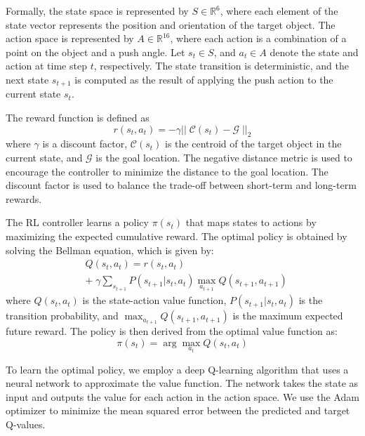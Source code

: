 Formally, the state space is represented by $S \in \mathbb{R}^{6}$, where each element of the state vector represents the position and orientation of the target object. The action space is represented by $A \in \mathbb{R}^{16}$, where each action is a combination of a point on the object and a push angle. Let $s_t \in S$, and $a_t \in A$ denote the state and action at time step $t$, respectively. The state transition is deterministic, and the next state $s_{t+1}$ is computed as the result of applying the push action to the current state $s_t$.

The reward function is defined as 
\begin{equation}
r(s_t, a_t) = -\gamma ||\; \mathcal{C}(s_t) - \mathcal{G}\; ||_2
\end{equation}
where $\gamma$ is a discount factor, $\mathcal{C}(s_t)$ is the centroid of the target object in the current state, and $\mathcal{G}$ is the goal location. The negative distance metric is used to encourage the controller to minimize the distance to the goal location. The discount factor is used to balance the trade-off between short-term and long-term rewards.

The RL controller learns a policy $\pi(s_t)$ that maps states to actions by maximizing the expected cumulative reward. The optimal policy is obtained by solving the Bellman equation, which is given by:
\begin{equation}
\begin{aligned}
    &Q(s_t, a_t) = r(s_t, a_t) \\
    &+\; \gamma \sum_{s_{t+1}} P(s_{t+1}|s_t,a_t) \max_{a_{t+1}} Q(s_{t+1}, a_{t+1})
\end{aligned}
\end{equation}
where $Q(s_t, a_t)$ is the state-action value function, $P(s_{t+1}|s_t,a_t)$ is the transition probability, and $\max_{a_{t+1}} Q(s_{t+1}, a_{t+1})$ is the maximum expected future reward. The policy is then derived from the optimal value function as:
\begin{equation}
    \pi(s_t) = \arg\max_{a_t} Q(s_t, a_t)
\end{equation}

To learn the optimal policy, we employ a deep Q-learning algorithm that uses a neural network to approximate the value function. The network takes the state as input and outputs the value for each action in the action space. We use the Adam optimizer to minimize the mean squared error between the predicted and target Q-values.

